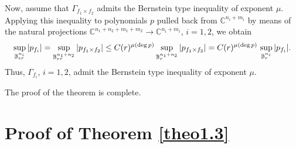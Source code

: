 \documentclass[11pt, oneside]{amsart}
\begin{document}
Now, assume that $\Gamma_{f_1\times f_2}$ admits the Bernstein type inequality of exponent $\mu$. 
Applying this inequality to polynomials $p$ pulled back from $\mathbb C^{n_i+m_i}$ by means of the natural projections $\mathbb C^{n_1+n_2+m_1+m_2}\rightarrow \mathbb C^{n_i+m_i}$, $i=1,2$, we obtain
\[
\sup_{\mathbb B_{er}^{n_i}}|p_{f_i}|=\sup_{\mathbb B_{er}^{n_1+n_2}}|p_{f_1\times f_2}|\le C(r)^{\mu({\rm deg}\,p)}
\sup_{\mathbb B_{r}^{n_1+n_2}}|p_{f_1\times f_2}|=C(r)^{\mu({\rm deg}\,p)}\,
\sup_{\mathbb B_{r}^{n_i}}|p_{f_i}|.
\]
Thus, $\Gamma_{f_i}$, $i=1,2$, admit the Bernstein type inequality of exponent $\mu$.

The proof of the theorem is complete.

\section{Proof of Theorem \ref{theo1.3}}
\end{document}

